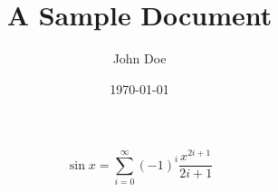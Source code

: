 \documentclass{article}
\title{A Sample Document}
\author{John Doe}
\date{\today}
\begin{document}
	\maketitle
	\[ \sin x = \sum_{i=0}^\infty (-1)^i \frac{x^{2i+1}}{2i+1} \]
\end{document}
